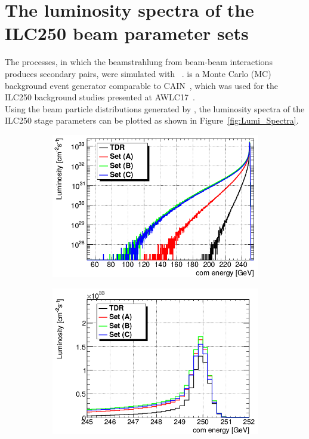 \newpage
\section{The luminosity spectra of the ILC250 beam parameter sets}
\label{sec:Envelopes}
The processes, in which the beamstrahlung from beam-beam interactions produces secondary \Pep \Pem pairs, were simulated with \guineapig~\cite{Schulte:1997nga}.
\guineapig is a Monte Carlo (MC) background event generator comparable to CAIN~\cite{CAIN}, which was used for the ILC250 background studies presented at AWLC17~\cite{AWLC_Jeans}.\\
Using the beam particle distributions generated by \guineapig, the luminosity spectra of the ILC250 stage parameters can be plotted as shown in Figure~\ref{fig:Lumi_Spectra}.
\begin{figure}[h]
\centering
\begin{subfigure}[t]{0.49\textwidth}
\centering
\includegraphics[width=\textwidth]{figures/Lumi_Spectrum.png}
\caption{}
\end{subfigure}
\hspace*{0.08cm}
\begin{subfigure}[t]{0.49\textwidth}
\centering
\includegraphics[width=1.02\textwidth]{figures/Lumi_Spectrum_zoom.png}

\end{subfigure}
\end{figure}
